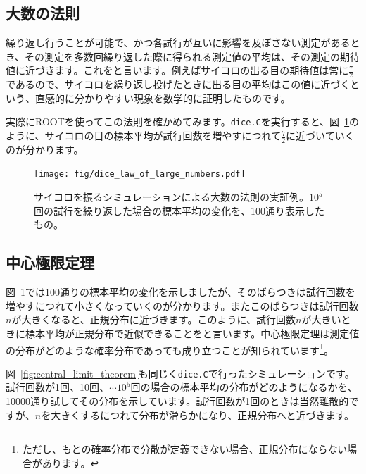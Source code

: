 \subsection{大数の法則}

繰り返し行うことが可能で、かつ各試行が互いに影響を及ぼさない測定があるとき、その測定を多数回繰り返した際に得られる測定値の平均は、その測定の期待値に近づきます。これをと言います。例えばサイコロの出る目の期待値は常に$\frac{7}{2}$であるので、サイコロを繰り返し投げたときに出る目の平均はこの値に近づくという、直感的に分かりやすい現象を数学的に証明したものです。

実際にROOTを使ってこの法則を確かめてみます。\texttt{dice.C}を実行すると、図~\ref{fig:dice_law_of_large_numbers}のように、サイコロの目の標本平均が試行回数を増やすにつれて$\frac{7}{2}$に近づいていくのが分かります。

\begin{figure}
  \centering
  \texttt{[image: fig/dice\_law\_of\_large\_numbers.pdf]}
  \caption{サイコロを振るシミュレーションによる大数の法則の実証例。$10^5$回の試行を繰り返した場合の標本平均の変化を、100通り表示したもの。}
  \label{fig:dice_law_of_large_numbers}
\end{figure}

\subsection{中心極限定理}

図~\ref{fig:dice_law_of_large_numbers}では100通りの標本平均の変化を示しましたが、そのばらつきは試行回数を増やすにつれて小さくなっていくのが分かります。またこのばらつきは試行回数$n$が大きくなると、正規分布に近づきます。このように、試行回数$n$が大きいときに標本平均が正規分布で近似できることをと言います。中心極限定理は測定値の分布がどのような確率分布であっても成り立つことが知られています\footnote{ただし、もとの確率分布で分散が定義できない場合、正規分布にならない場合があります。}。

図~\ref{fig:central_limit_theorem}も同じく\texttt{dice.C}で行ったシミュレーションです。試行回数が1回、10回、$\cdots$$10^5$回の場合の標本平均の分布がどのようになるかを、10000通り試してその分布を示しています。試行回数が1回のときは当然離散的ですが、$n$を大きくするにつれて分布が滑らかになり、正規分布へと近づきます。


